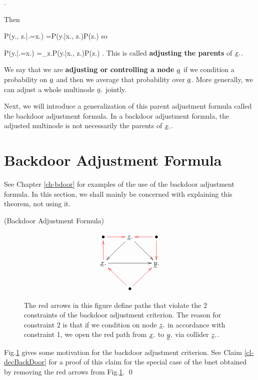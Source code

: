 \beq
{}
\;.
\eeq

Then

\beq
P(y., z.|\cald \rvx.=x.)
=P(y.|x., z.)P(z.)
\eeq
so

\beq
P(y.|\cald \rvx.=x.)
=\sum_{z.}P(y.|x., z.)P(z.)
\;.
\eeq
This is called
{\bf adjusting the parents}
of $\rvx.$.


We say that
we are {\bf adjusting
or controlling a node $\rva$}
if we condition
a probability on $\rva$ and
then we average
that probability over $\rva$.
More generally,
we can adjust a whole
multinode $\rva.$ jointly.

Next,
we will introduce
a generalization
of
this parent adjustment formula
called the
backdoor adjustment formula.
In a backdoor adjustment formula,
the adjusted multinode
is not necessarily
 the parents of $\rvx.$.

\section{Backdoor Adjustment Formula}

See Chapter \ref{ch-bdoor}
for examples of the use of the
backdoor adjustment formula.
In this section,
we shall mainly be
concerned with
explaining this
theorem, not using it.


\bdoordef

\begin{claim} (Backdoor
Adjustment Formula)

\bdoorclaim
\end{claim}
\proof

\begin{figure}[h!]
$$\xymatrix
{
\bullet\ar@[red][r]
&\rvz.\ar[dl]\ar[dr]
&\bullet\ar@[red][l]\ar@[red][d]
\\
\rvx.\ar[rr]\ar@[red][u]
&&\rvy.
\\
&\bullet\ar@[red][ul]\ar@[red][ur]
}
$$
\caption{The red arrows in this figure define paths 
that violate the 2 constraints of the backdoor adjustment criterion.
 The reason for constraint 2 is that
 if we condition on node $\rvz.$
 in accordance with constraint 1, we open the
 red  path from $\rvx.$ to $\rvy.$
 via collider $\rvz.$.}
 \label{fig-bdoor-red-paths}
\end{figure}

 Fig.\ref{fig-bdoor-red-paths}
gives some motivation for the backdoor adjustment criterion.
See Claim \ref{cl-decBackDoor}
for a proof of this claim
for the
special case of the bnet
obtained by removing the red arrows from Fig.\ref{fig-bdoor-red-paths}.
\qed

